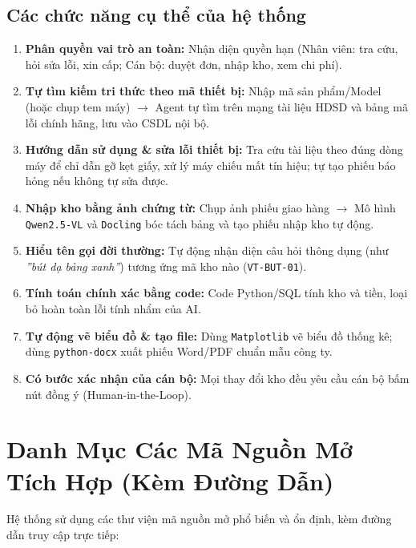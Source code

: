 \documentclass[11pt,a4paper]{article}
\begin{document}
\subsection{Các chức năng cụ thể của hệ thống}
\begin{enumerate}
    \item \textbf{Phân quyền vai trò an toàn:} Nhận diện quyền hạn (Nhân viên: tra cứu, hỏi sửa lỗi, xin cấp; Cán bộ: duyệt đơn, nhập kho, xem chi phí).
    \item \textbf{Tự tìm kiếm tri thức theo mã thiết bị:} Nhập mã sản phẩm/Model (hoặc chụp tem máy) $\rightarrow$ Agent tự tìm trên mạng tài liệu HDSD và bảng mã lỗi chính hãng, lưu vào CSDL nội bộ.
    \item \textbf{Hướng dẫn sử dụng \& sửa lỗi thiết bị:} Tra cứu tài liệu theo đúng dòng máy để chỉ dẫn gỡ kẹt giấy, xử lý máy chiếu mất tín hiệu; tự tạo phiếu báo hỏng nếu không tự sửa được.
    \item \textbf{Nhập kho bằng ảnh chứng từ:} Chụp ảnh phiếu giao hàng $\rightarrow$ Mô hình \texttt{Qwen2.5-VL} và \texttt{Docling} bóc tách bảng và tạo phiếu nhập kho tự động.
    \item \textbf{Hiểu tên gọi đời thường:} Tự động nhận diện câu hỏi thông dụng (như \textit{''bút dạ bảng xanh''}) tương ứng mã kho nào (\texttt{VT-BUT-01}).
    \item \textbf{Tính toán chính xác bằng code:} Code Python/SQL tính kho và tiền, loại bỏ hoàn toàn lỗi tính nhẩm của AI.
    \item \textbf{Tự động vẽ biểu đồ \& tạo file:} Dùng \texttt{Matplotlib} vẽ biểu đồ thống kê; dùng \texttt{python-docx} xuất phiếu Word/PDF chuẩn mẫu công ty.
    \item \textbf{Có bước xác nhận của cán bộ:} Mọi thay đổi kho đều yêu cầu cán bộ bấm nút đồng ý (Human-in-the-Loop).
\end{enumerate}

\section{Danh Mục Các Mã Nguồn Mở Tích Hợp (Kèm Đường Dẫn)}

Hệ thống sử dụng các thư viện mã nguồn mở phổ biến và ổn định, kèm đường dẫn truy cập trực tiếp:
\end{document}

